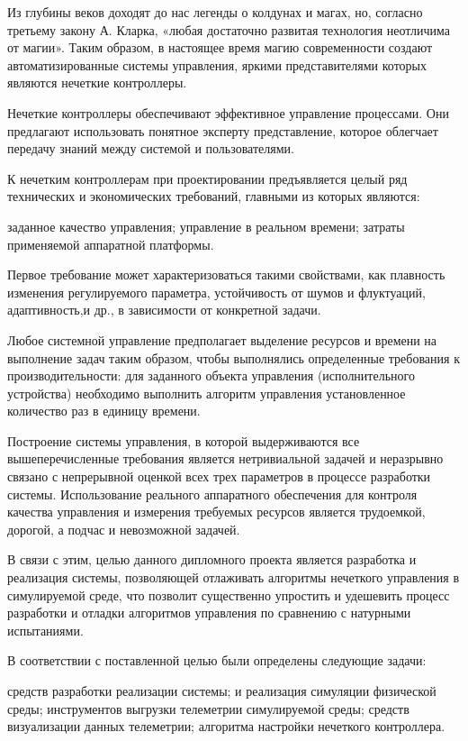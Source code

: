 \label{sec:intro}

Из глубины веков доходят до нас легенды о колдунах и магах, но, согласно третьему закону А. Кларка, «любая достаточно развитая технология неотличима от магии». Таким образом, в настоящее время магию современности создают автоматизированные системы управления, яркими представителями которых являются нечеткие контроллеры.

Нечеткие контроллеры обеспечивают эффективное управление процессами. Они предлагают использовать понятное эксперту представление, которое облегчает передачу знаний между системой и пользователями.

К нечетким контроллерам при проектировании предъявляется целый ряд технических и экономических требований, главными из которых являются:

\begin{itemize}
   заданное качество управления;
   управление в реальном времени; 
   затраты применяемой аппаратной платформы.
\end{itemize}

Первое требование может характеризоваться такими свойствами, как плавность изменения регулируемого параметра, устойчивость от шумов и флуктуаций, адаптивность,и др., в зависимости от конкретной задачи.

Любое системной управление предполагает выделение ресурсов и времени на выполнение задач таким образом, чтобы выполнялись определенные требования к производительности: для заданного объекта управления (исполнительного устройства) необходимо выполнить алгоритм управления установленное количество раз в единицу времени. 

Построение системы управления, в которой выдерживаются все вышеперечисленные требования является нетривиальной задачей и неразрывно связано с непрерывной оценкой всех трех параметров в процессе разработки системы. Использование реального аппаратного обеспечения для контроля качества управления и измерения требуемых ресурсов является трудоемкой, дорогой, а подчас и невозможной задачей.

В связи с этим, целью данного дипломного проекта является разработка и реализация системы, позволяющей отлаживать алгоритмы нечеткого управления в симулируемой среде, что позволит существенно упростить и удешевить процесс разработки и отладки алгоритмов управления по сравнению с натурными испытаниями.	

В соответствии с поставленной целью были определены следующие задачи:

\begin{itemize}
   средств разработки реализации системы;
   и реализация симуляции физической среды;
   инструментов выгрузки телеметрии симулируемой среды;
   средств визуализации данных телеметрии;
   алгоритма настройки нечеткого контроллера.
\end{itemize}